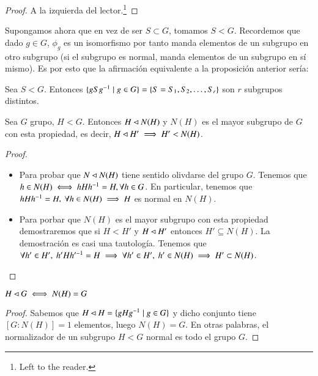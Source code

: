 \begin{proof}
	A la izquierda del lector.\footnote{Left to the reader.}
\end{proof}

Supongamos ahora que en vez de ser $S \subset G$, tomamos $S < G$. Recordemos que dado $g\in G$, $\phi_g$ es un isomorfismo por tanto manda elementos de un subgrupo en otro subgrupo (si el subgrupo es normal, manda elementos de un subgrupo en sí mismo). Es por esto que la afirmación equivalente a la proposición anterior sería:

\begin{pro}
	Sea $S < G$. Entonces $\{gSg^{-1} \mid g \in G\} = \{S = S_1, S_2, \dots, S_r\}$ son $r$ subgrupos distintos.
\end{pro}


\begin{thm}
	Sea $G$ grupo, $H < G$. Entonces $H \lhd N(H)$ y $N(H)$ es el mayor subgrupo de $G$ con esta propiedad, es decir, $H \lhd H' \implies H' < N(H)$.
\end{thm}

\begin{proof}$ $\newline
	\begin{itemize}
		\item Para probar que $N\lhd N(H)$ tiene sentido olivdarse del grupo $G$. Tenemos que $h \in N(H) \iff hHh^{-1} = H, \forall h \in G$. En particular, tenemos que $hHh^{-1} = H,\ \forall h \in N(H) \implies H$ es normal en $N(H)$.
		
		\item Para porbar que $N(H)$ es el mayor subgrupo con esta propiedad demostraremos que si $H < H'$ y $H \lhd H'$ entonces $H' \subseteq N(H)$. La demostración es casi una tautología. Tenemos que $\forall h' \in H',\ h'Hh'^{-1} = H \implies \forall h' \in H',\ h' \in N(H) \implies H' \subset N(H)$.
	\end{itemize}
\end{proof}

\begin{cor}
	$H \lhd G \iff N(H) = G$
\end{cor}

\begin{proof}
	Sabemos que $H\lhd H = \{gHg^{-1} \mid g \in G\}$ y dicho conjunto tiene $[G:N(H)] = 1$ elementos, luego $N(H) = G$. En otras palabras, el normalizador de un subgrupo $H < G$ normal es todo el grupo $G$.
\end{proof}

